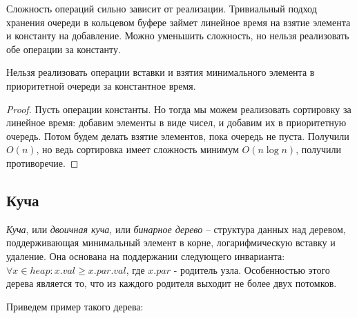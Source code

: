 \documentclass[../main.tex]{subfiles}
\begin{document}
	Сложность операций сильно зависит от реализации. Тривиальный подход хранения очереди в кольцевом буфере займет линейное время на взятие элемента и константу на добавление. Можно уменьшить сложность, но нельзя реализовать обе операции за константу.
	
	\begin{theorem}
		Нельзя реализовать операции вставки и взятия минимального элемента в приоритетной очереди за константное время.
	\end{theorem}
	\begin{proof}
		Пусть операции константы. Но тогда мы можем реализовать сортировку за линейное время: добавим элементы в виде чисел, и добавим их в приоритетную очередь. Потом будем делать взятие элементов, пока очередь не пуста. Получили $O(n)$, но ведь сортировка имеет сложность минимум $O(n \log n)$, получили противоречие.
	\end{proof}
	
	\subsection{Куча}
	
	\textit{Куча}, или \textit{двоичная куча}, или \textit{бинарное дерево} -- структура данных над деревом, поддерживающая минимальный элемент в корне, логарифмическую вставку и удаление. Она основана на поддержании следующего инварианта: $\forall x \in heap: x.val \geqslant x.par.val$, где $x.par$ - родитель узла. Особенностью этого дерева является то, что из каждого родителя выходит не более двух потомков.
	
	Приведем пример такого дерева:
	
		
		
		
		
		
\end{document}
